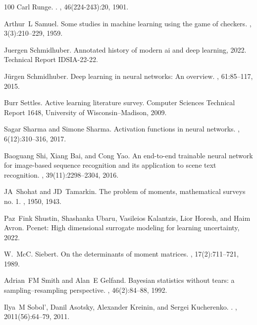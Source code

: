 \documentclass[a4paper,fleqn]{article}
\begin{document}
\begin{thebibliography}{100}
Carl Runge.
.
, 46(224-243):20,
  1901.

Arthur~L Samuel.
\newblock Some studies in machine learning using the game of checkers.
, 3(3):210--229, 1959.

Juergen Schmidhuber.
\newblock Annotated history of modern ai and deep learning, 2022.
\newblock Technical Report IDSIA-22-22.

J{\"u}rgen Schmidhuber.
\newblock Deep learning in neural networks: An overview.
, 61:85--117, 2015.

Burr Settles.
\newblock Active learning literature survey.
\newblock Computer Sciences Technical Report 1648, University of
  Wisconsin--Madison, 2009.

Sagar Sharma and Simone Sharma.
\newblock Activation functions in neural networks.
, 6(12):310--316, 2017.

Baoguang Shi, Xiang Bai, and Cong Yao.
\newblock An end-to-end trainable neural network for image-based sequence
  recognition and its application to scene text recognition.
,
  39(11):2298--2304, 2016.

JA~Shohat and JD~Tamarkin.
\newblock The problem of moments, mathematical surveys no. 1.
, 1950, 1943.

Paz~Fink Shustin, Shashanka Ubaru, Vasileios Kalantzis, Lior Horesh, and Haim
  Avron.
\newblock Pcenet: High dimensional surrogate modeling for learning uncertainty,
  2022.

W.~McC. Siebert.
\newblock On the determinants of moment matrices.
, 17(2):711--721, 1989.

Adrian~FM Smith and Alan~E Gelfand.
\newblock Bayesian statistics without tears: a sampling--resampling
  perspective.
, 46(2):84--88, 1992.

Ilya~M Sobol', Danil Asotsky, Alexander Kreinin, and Sergei Kucherenko.
.
, 2011(56):64--79, 2011.


\end{thebibliography}
\end{document}
